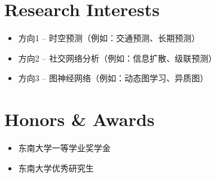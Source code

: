 \documentclass[11pt,a4paper,UTF8]{ctexart}
\begin{document}
\section{Research Interests}

\begin{itemize}
    \item 方向1 -- 时空预测（例如：交通预测、长期预测）
    \item 方向2 -- 社交网络分析（例如：信息扩散、级联预测）
    \item 方向3 -- 图神经网络（例如：动态图学习、异质图）
\end{itemize}

\section{Honors \& Awards}

\begin{itemize}
    \item 东南大学一等学业奖学金
    \item 东南大学优秀研究生
\end{itemize}






\end{document}
